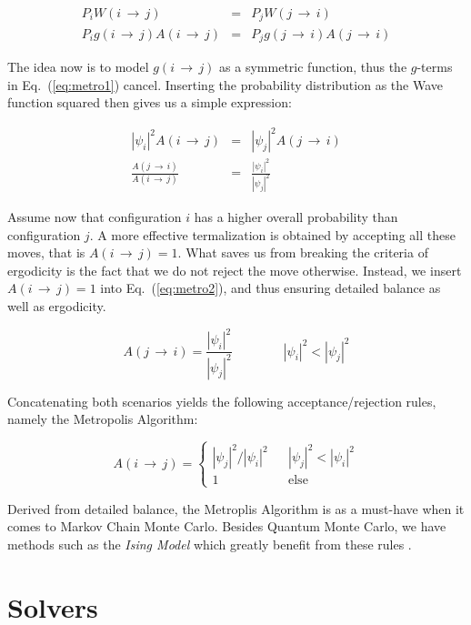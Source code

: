 \begin{eqnarray}
 P_iW(i\,\rightarrow\,j) &=& P_jW(j\,\rightarrow\,i) \nonumber \\
 P_ig(i\,\rightarrow\,j)A(i\,\rightarrow\,j) &=& P_jg(j\,\rightarrow\,i)A(j\,\rightarrow\,i)
 \label{eq:metro1}
\end{eqnarray}

The idea now is to model $g(i\,\rightarrow\,j)$ as a symmetric function, thus the $g$-terms in Eq.~(\ref{eq:metro1}) cancel. Inserting the probability distribution as the Wave function squared then gives us a simple expression:

\begin{eqnarray}
  |\psi_i|^2A(i\,\rightarrow\,j) &=& |\psi_j|^2A(j\,\rightarrow\,i) \nonumber \\
  \frac{A(j\,\rightarrow\,i)}{A(i\,\rightarrow\,j)} &=& \frac{|\psi_i|^2}{|\psi_j|^2}
  \label{eq:metro2}
\end{eqnarray}

Assume now that configuration $i$ has a higher overall probability than configuration $j$. A more effective termalization is obtained by accepting all these moves, that is $A(i\,\rightarrow\,j) = 1$. What saves us from breaking the criteria of ergodicity is the fact that we do not reject the move otherwise. Instead, we insert $A(i\,\rightarrow\,j) = 1$ into Eq.~(\ref{eq:metro2}), and thus ensuring detailed balance as well as ergodicity.

\begin{equation*}
 A(j\,\rightarrow\,i) = \frac{|\psi_i|^2}{|\psi_j|^2} \qquad\qquad  |\psi_i|^2 < |\psi_j|^2
\end{equation*}


Concatenating both scenarios yields the following acceptance/rejection rules, namely the Metropolis Algorithm:

\begin{equation}
 A(i\,\rightarrow\,j) = \left\{\begin{array}{ccc}
 |\psi_j|^2/|\psi_i|^2& & |\psi_j|^2 < |\psi_i|^2\\
1  & & \mathrm{else}  \end{array}\right.
\label{eq:Metropolis_standard}
\end{equation}

Derived from detailed balance, the Metroplis Algorithm is as a must-have when it comes to Markov Chain Monte Carlo. Besides Quantum Monte Carlo, we have methods such as the \textit{Ising Model} which greatly benefit from these rules \cite{morten}.

\section{Solvers}







